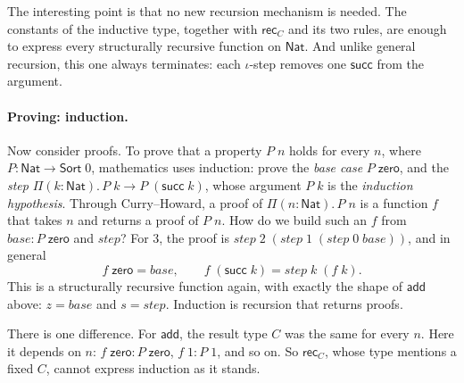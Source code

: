 \documentclass[acmsmall,screen,nonacm]{acmart}
\newcommand{\Sort}[1]{\mathsf{Sort}\;#1}
\newcommand{\tPi}[3]{\Pi(#1{:}#2).\,#3}
\newcommand{\Nat}{\mathsf{Nat}}
\newcommand{\zero}{\mathsf{zero}}
\newcommand{\tsucc}{\mathsf{succ}}
\newcommand{\add}{\mathsf{add}}
\begin{document}
The interesting point is that no new recursion mechanism is needed.
The constants of the inductive type, together with $\mathsf{rec}_C$ and its two rules, are enough to express every structurally recursive function on $\Nat$.
And unlike general recursion, this one always terminates: each $\iota$-step removes one $\tsucc$ from the argument.

\paragraph{Proving: induction.}
Now consider proofs.
To prove that a property $P\;n$ holds for every $n$, where $P : \Nat \to \Sort{0}$, mathematics uses induction:
prove the \emph{base case} $P\;\zero$, and the \emph{step} $\tPi{k}{\Nat}{P\;k \to P\;(\tsucc\;k)}$, whose argument $P\;k$ is the \emph{induction hypothesis}.
Through Curry--Howard, a proof of $\tPi{n}{\Nat}{P\;n}$ is a function $f$ that takes $n$ and returns a proof of $P\;n$.
How do we build such an $f$ from $\mathit{base} : P\;\zero$ and $\mathit{step}$?
For $3$, the proof is $\mathit{step}\;2\;(\mathit{step}\;1\;(\mathit{step}\;0\;\mathit{base}))$, and in general
\[
f\;\zero = \mathit{base}, \qquad f\;(\tsucc\;k) = \mathit{step}\;k\;(f\;k).
\]
This is a structurally recursive function again, with exactly the shape of $\add$ above: $z = \mathit{base}$ and $s = \mathit{step}$.
Induction is recursion that returns proofs.

There is one difference.
For $\add$, the result type $C$ was the same for every $n$.
Here it depends on $n$: $f\;\zero : P\;\zero$, $f\;1 : P\;1$, and so on.
So $\mathsf{rec}_C$, whose type mentions a fixed $C$, cannot express induction as it stands.
\end{document}
